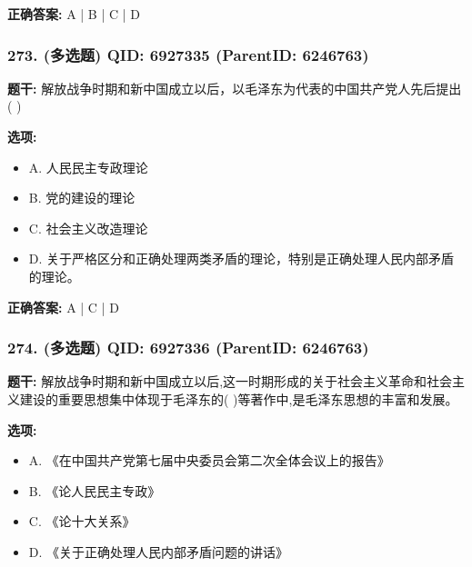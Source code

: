 \documentclass[12pt,UTF8]{ctexart}
\begin{document}
\textbf{正确答案:}
A | B | C | D

\vspace{0.3em}\hrulefill\vspace{0.7em}

\subsubsection*{273. (多选题) \small QID: 6927335 (ParentID: 6246763)}

\textbf{题干:}
解放战争时期和新中国成立以后，以毛泽东为代表的中国共产党人先后提出(   )



\textbf{选项:}
\begin{itemize}[leftmargin=*]

  \item A. 人民民主专政理论

  \item B. 党的建设的理论

  \item C. 社会主义改造理论

  \item D. 关于严格区分和正确处理两类矛盾的理论，特别是正确处理人民内部矛盾的理论。

\end{itemize}

\textbf{正确答案:}
A | C | D

\vspace{0.3em}\hrulefill\vspace{0.7em}

\subsubsection*{274. (多选题) \small QID: 6927336 (ParentID: 6246763)}

\textbf{题干:}
解放战争时期和新中国成立以后,这一时期形成的关于社会主义革命和社会主义建设的重要思想集中体现于毛泽东的(   )等著作中,是毛泽东思想的丰富和发展。



\textbf{选项:}
\begin{itemize}[leftmargin=*]

  \item A. 《在中国共产党第七届中央委员会第二次全体会议上的报告》

  \item B. 《论人民民主专政》

  \item C. 《论十大关系》

  \item D. 《关于正确处理人民内部矛盾问题的讲话》

\end{itemize}
\end{document}
